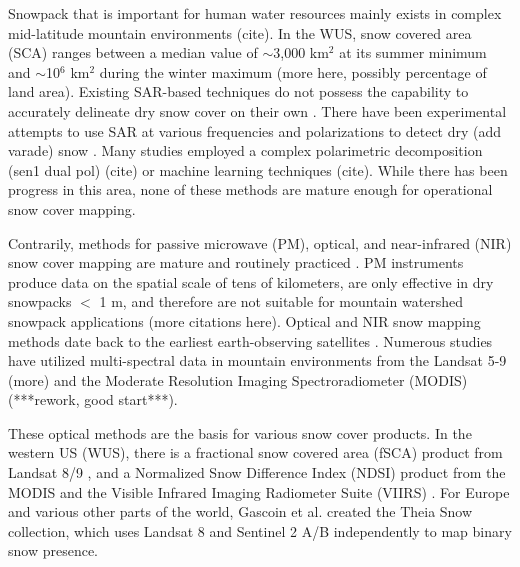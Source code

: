 Snowpack that is important for human water resources mainly exists in complex mid-latitude mountain environments (cite). In the WUS, snow covered area (SCA) ranges between a median value of $\sim$3,000 km$^{2}$ at its summer minimum and $\sim$10$^{6}$ km$^{2}$ during the winter maximum \citep{rittgerSnowToday2022} (more here, possibly percentage of land area). Existing SAR-based techniques do not possess the capability to accurately delineate dry snow cover on their own \citep{tsaiRemoteSensingSnow2019}. There have been experimental attempts to use SAR at various frequencies and polarizations to detect dry (add varade) snow \citep{rottThematicStudiesAlpine1994, shiMappingSeasonalSnow1997}. Many studies employed a complex polarimetric decomposition (sen1 dual pol) (cite) or machine learning techniques (cite). While there has been progress in this area, none of these methods are mature enough for operational snow cover mapping. \par

Contrarily, methods for passive microwave (PM), optical, and near-infrared (NIR) snow cover mapping are mature and routinely practiced \citep{dozierMultispectralHyperspectralRemote2004,saberiReviewSnowWater2020}. PM instruments produce data on the spatial scale of tens of kilometers, are only effective in dry snowpacks $<$ 1 m, and therefore are not suitable for mountain watershed snowpack applications (more citations here). Optical and NIR snow mapping methods date back to the earliest earth-observing satellites \citep{rangoSatellitePotentialsSnowcover1976a}. Numerous studies have utilized multi-spectral data in mountain environments from the Landsat 5-9 \citep{dozierSpectralSignatureAlpine1989} (more) and the Moderate Resolution Imaging Spectroradiometer (MODIS) \citep{painterRetrievalSubpixelSnowcovered2003, painterRetrievalSubpixelSnow2009, rittgerAssessmentMethodsMapping2013} (***rework, good start***). 

These optical methods are the basis for various snow cover products. In the western US (WUS), there is a fractional snow covered area (fSCA) product from Landsat 8/9 \citep{selkowitzUSGSLandsatSnow2017}, and a Normalized Snow Difference Index (NDSI) \citep{dozierSpectralSignatureAlpine1989, hallDevelopmentMethodsMapping1995} product from the MODIS \citep{hallMODISSnowcoverProducts2002} and the Visible Infrared Imaging Radiometer Suite (VIIRS) \citep{justiceLandCryosphereProducts2013}. For Europe and various other parts of the world, Gascoin et al. \citep{gascoinTheiaSnowCollection2019a} created the Theia Snow collection, which uses Landsat 8 and Sentinel 2 A/B independently to map binary snow presence.

